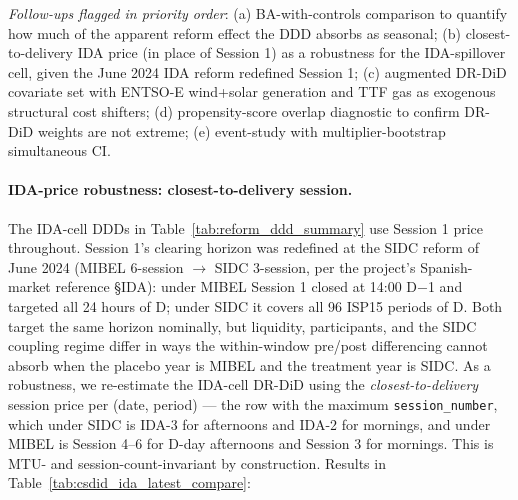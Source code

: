 \documentclass[11pt,a4paper]{article}
\newcommand{\code}[1]{\nolinkurl{#1}}
\begin{document}
\emph{Follow-ups flagged in priority order}: (a) BA-with-controls comparison to quantify how much of the apparent reform effect the DDD absorbs as seasonal; (b) closest-to-delivery IDA price (in place of Session 1) as a robustness for the IDA-spillover cell, given the June 2024 IDA reform redefined Session 1; (c) augmented DR-DiD covariate set with ENTSO-E wind+solar generation and TTF gas as exogenous structural cost shifters; (d) propensity-score overlap diagnostic to confirm DR-DiD weights are not extreme; (e) event-study with multiplier-bootstrap simultaneous CI.










\paragraph{IDA-price robustness: closest-to-delivery session.}
The IDA-cell DDDs in Table~\ref{tab:reform_ddd_summary} use Session 1 price throughout. Session 1's clearing horizon was redefined at the SIDC reform of June 2024 (MIBEL 6-session $\to$ SIDC 3-session, per the project's Spanish-market reference \S IDA): under MIBEL Session 1 closed at 14:00 D$-$1 and targeted all 24 hours of D; under SIDC it covers all 96 ISP15 periods of D. Both target the same horizon nominally, but liquidity, participants, and the SIDC coupling regime differ in ways the within-window pre/post differencing cannot absorb when the placebo year is MIBEL and the treatment year is SIDC. As a robustness, we re-estimate the IDA-cell DR-DiD using the \emph{closest-to-delivery} session price per (date, period) --- the row with the maximum \code{session_number}, which under SIDC is IDA-3 for afternoons and IDA-2 for mornings, and under MIBEL is Session 4--6 for D-day afternoons and Session 3 for mornings. This is MTU- and session-count-invariant by construction. Results in Table~\ref{tab:csdid_ida_latest_compare}:


\end{document}
